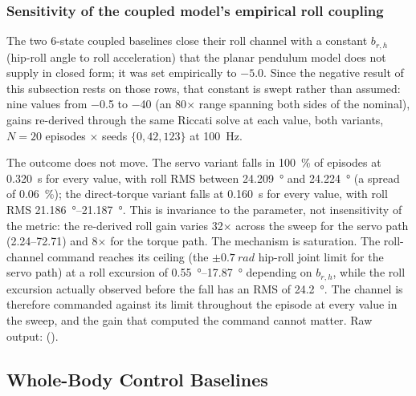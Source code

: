 \documentclass[a4paper,fleqn]{cas-dc}
\begin{document}
\subsubsection{Sensitivity of the coupled model's empirical roll coupling}
\label{sec:b_roll_hip}

The two 6-state coupled baselines close their roll channel with a constant $b_{r,h}$ (hip-roll angle to roll acceleration) that the planar pendulum model does not supply in closed form; it was set empirically to $-5.0$. Since the negative result of this subsection rests on those rows, that constant is swept rather than assumed: nine values from \num{-0.5} to \num{-40} (an \num{80}$\times$ range spanning both sides of the nominal), gains re-derived through the same Riccati solve at each value, both variants, $N{=}20$ episodes $\times$ seeds $\{0,42,123\}$ at \SI{100}{Hz}.

The outcome does not move. The servo variant falls in \SI{100}{\percent} of episodes at \SI{0.320}{s} for every value, with roll RMS between \SI{24.209}{\degree} and \SI{24.224}{\degree} (a spread of \SI{0.06}{\percent}); the direct-torque variant falls at \SI{0.160}{s} for every value, with roll RMS \SIrange{21.186}{21.187}{\degree}. This is invariance to the parameter, not insensitivity of the metric: the re-derived roll gain varies \num{32}$\times$ across the sweep for the servo path (\SIrange{2.24}{72.71}{}) and \num{8}$\times$ for the torque path. The mechanism is saturation. The roll-channel command reaches its ceiling (the $\pm\SI{0.7}{rad}$ hip-roll joint limit for the servo path) at a roll excursion of \SIrange{0.55}{17.87}{\degree} depending on $b_{r,h}$, while the roll excursion actually observed before the fall has an RMS of \SI{24.2}{\degree}. The channel is therefore commanded against its limit throughout the episode at every value in the sweep, and the gain that computed the command cannot matter. Raw output:  ().


\subsection{Whole-Body Control Baselines}
\label{sec:wbc}
\end{document}
